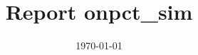 \documentclass[a4wide]{article}
\title{Report onpct_sim} \\
\date{\today}
\begin{document}
\maketitle
\begin{figure}[h]
\caption{ }
\label{fig:example}
\end{figure}
\end{document}
